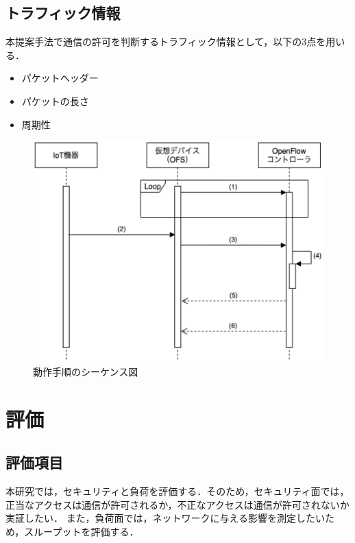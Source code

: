 \documentclass[a4paper,10pt,twocolumn,uplatex]{jsarticle}
\begin{document}
\subsection{トラフィック情報}
本提案手法で通信の許可を判断するトラフィック情報として，以下の3点を用いる．

\begin{itemize}
  \item パケットヘッダー
  \item パケットの長さ
  \item 周期性
\end{itemize}

\begin{figure}[!tb]
  \centering
  \includegraphics[width=\linewidth]{img/sequence.eps}
  \caption{動作手順のシーケンス図}
  \label{fig:sequence}
\end{figure}

\section{評価}

\subsection{評価項目}
本研究では，セキュリティと負荷を評価する．そのため，セキュリティ面では，正当なアクセスは通信が許可されるか，不正なアクセスは通信が許可されないか実証したい．
また，負荷面では，ネットワークに与える影響を測定したいため，スループットを評価する．
\end{document}

